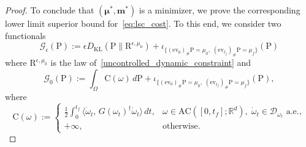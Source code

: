 \documentclass{amsart}
\numberwithin{equation}{section}
\begin{document}
\begin{proof}
To conclude that $(\boldsymbol{\mu}^*, \mathbf{m}^*)$ is a minimizer, we prove the corresponding lower limit superior bound for~\eqref{eq:lsc_cost}. To this end, we consider two functionals
\[
\mathcal G_{\epsilon}(\mathrm{P}):= \epsilon D_{\mathrm{KL}}(\mathrm{P} \| \mathrm{R}^{\epsilon,\mu_0}) + \iota_{\{(\mathrm{ev}_0)_\# \mathrm{P}=\mu_0,\; (\mathrm{ev}_{t_f})_\# \mathrm{P}=\mu_f\}}(\mathrm{P})
\]
where $\mathrm{R}^{\epsilon,\mu_0}$ is the law of~\eqref{uncontrolled_dynamic_constraint} and
\[
\mathcal G_{0}(\mathrm{P}):=\int_{\Omega} \mathrm{C}(\omega) \, d\mathrm{P} + \iota_{\{(\mathrm{ev}_0)_\# \mathrm{P}=\mu_0,\; (\mathrm{ev}_{t_f})_\# \mathrm{P}=\mu_f\}}(\mathrm{P}),
\]
where
\begin{equation}\label{eq: rate_function}
\mathrm{C}(\omega):=
\begin{cases}
\displaystyle
\frac12\int_{0}^{t_{f}}
\big\langle \dot\omega_t,\,
G(\omega_t)^\dagger \dot\omega_t\big\rangle\,dt,
&
\omega \in \mathrm{AC}([0,t_f]; \mathbb{R}^d), \; \dot{\omega}_t \in \mathcal{D}_{\omega_t} \text{ a.e.}, \\[10pt]
+\infty, & \text{otherwise}.
\end{cases}
\end{equation}


\end{proof}
\end{document}
